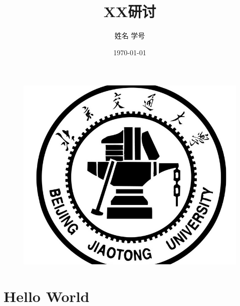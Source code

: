 \documentclass[11pt,a4paper,UTF8]{ctexart}
\title{XX研讨}
\author{姓名 学号}
\date{\today}
\begin{document}
	\begin{figure}[H]
		\centering
		\includegraphics[width=0.7\linewidth]{Pictures/BJTU_logo}
	\end{figure}

	
	\maketitle
	\newpage
	\tableofcontents
	\newpage

	\section{Hello World}	

	\newpage
\end{document}
